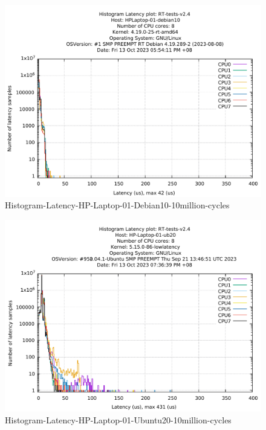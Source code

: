 \begin{figure}
\caption{Histogram-Latency-HP-Laptop-01-Debian10-10million-cycles}
\label{Histogram-Latency-HP-Laptop-01-Debian10-10million-cycles.pdf}
\centering
\includegraphics[width=1.00\textwidth]{Chap3/app-realtime/Histogram-Latency-HP-Laptop-01-Debian10-10million-cycles.pdf} 
\end{figure}	

\begin{figure}
\caption{Histogram-Latency-HP-Laptop-01-Ubuntu20-10million-cycles}
\label{Histogram-Latency-HP-Laptop-01-Ubuntu20-10million-cycles.pdf}
\centering
\includegraphics[width=1.00\textwidth]{Chap3/app-realtime/Histogram-Latency-HP-Laptop-01-Ubuntu20-10million-cycles.pdf} 
\end{figure}	

